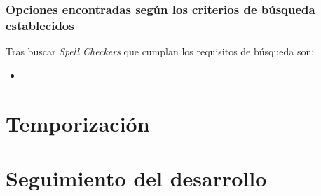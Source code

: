 \subsubsection{Opciones encontradas según los criterios de búsqueda establecidos}

Tras buscar \emph{Spell Checkers} que cumplan los requisitos de búsqueda son:

\begin{itemize}
    \item 
\end{itemize}


\section{Temporización}

\section{Seguimiento del desarrollo}
